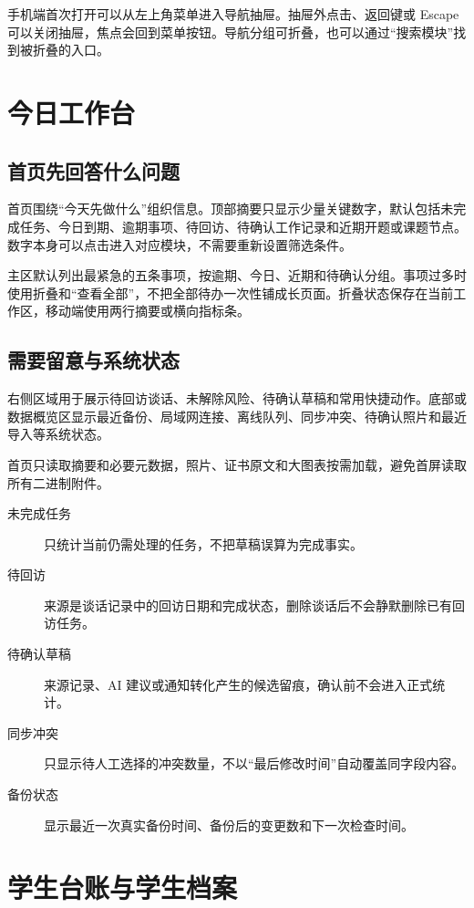 \documentclass[UTF8,zihao=-4,oneside]{ctexrep}
\begin{document}
手机端首次打开可以从左上角菜单进入导航抽屉。抽屉外点击、返回键或 Escape 可以关闭抽屉，焦点会回到菜单按钮。导航分组可折叠，也可以通过“搜索模块”找到被折叠的入口。

\chapter{今日工作台}

\section{首页先回答什么问题}

首页围绕“今天先做什么”组织信息。顶部摘要只显示少量关键数字，默认包括未完成任务、今日到期、逾期事项、待回访、待确认工作记录和近期开题或课题节点。数字本身可以点击进入对应模块，不需要重新设置筛选条件。

主区默认列出最紧急的五条事项，按逾期、今日、近期和待确认分组。事项过多时使用折叠和“查看全部”，不把全部待办一次性铺成长页面。折叠状态保存在当前工作区，移动端使用两行摘要或横向指标条。

\section{需要留意与系统状态}

右侧区域用于展示待回访谈话、未解除风险、待确认草稿和常用快捷动作。底部或数据概览区显示最近备份、局域网连接、离线队列、同步冲突、待确认照片和最近导入等系统状态。

首页只读取摘要和必要元数据，照片、证书原文和大图表按需加载，避免首屏读取所有二进制附件。

\begin{description}
  \item[未完成任务] 只统计当前仍需处理的任务，不把草稿误算为完成事实。
  \item[待回访] 来源是谈话记录中的回访日期和完成状态，删除谈话后不会静默删除已有回访任务。
  \item[待确认草稿] 来源记录、AI 建议或通知转化产生的候选留痕，确认前不会进入正式统计。
  \item[同步冲突] 只显示待人工选择的冲突数量，不以“最后修改时间”自动覆盖同字段内容。
  \item[备份状态] 显示最近一次真实备份时间、备份后的变更数和下一次检查时间。
\end{description}

\chapter{学生台账与学生档案}
\end{document}
